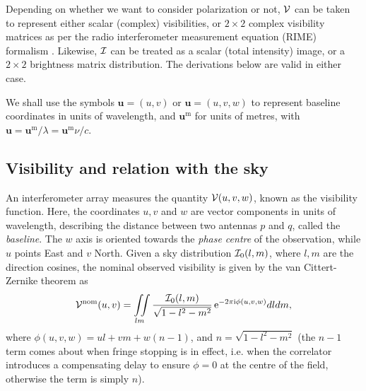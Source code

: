 \documentclass[useAMS,usenatbib]{mn2e}
\newcommand{\ee}{\mathrm{e}}
\newcommand{\ii}{\mathrm{i}}
\begin{document}
Depending on whether we want to consider polarization or not, $\mathcal{V}$ can be taken to represent either 
scalar (complex) visibilities, or $2\times2$ complex visibility matrices  as per the radio interferometer 
measurement equation (RIME) formalism \citep{smirnov2011revisiting}. Likewise, $\mathcal{I}$ can be treated as a scalar 
(total intensity) image, or a $2\times2$ brightness matrix distribution. The derivations below 
are valid in either case.

We shall use the symbols $\mathbf{u}=(u,v)$ or $\mathbf{u}=(u,v,w)$ to represent baseline coordinates in units of wavelength, and 
$\mathbf{u}^\mathrm{m}$ for units of metres, with $\mathbf{u} = \mathbf{u}^\mathrm{m}/\lambda = \mathbf{u}^\mathrm{m}\nu/c$.

\subsection{Visibility and relation with the sky}
\label{sec:visSky}
An interferometer array measures the quantity $\mathcal{V}(u,v,w)$, known as the visibility function.
Here, the coordinates $u,v$ and $w$ are vector components in units of wavelength, describing the distance between 
two antennas $p$ and $q$, called the \emph{baseline}. The $w$ axis is oriented towards the \emph{phase centre} of the observation,
while $u$ points East and $v$ North. Given a sky distribution $\mathcal{I}_0(l,m)$, where $l,m$ are the direction cosines,
the nominal observed visibility is given by the van 
Cittert-Zernike theorem \citep{thompson1999fundamentals,thompson2001fundamentals} as
\begin{equation}
\VV^\mathrm{nom}(u,v) =\iint\limits_{lm} \frac{\II_0(l,m)}{\sqrt{1-l^2 - m^2}}\,\ee^{-2\pi\ii\phi (u,v,w)}dldm, \label{eq:visSky:nom}
\end{equation} 
where $\phi(u,v,w)=ul+vm+w(n-1)$, and $n=\sqrt{1-l^2 - m^2}$ (the $n-1$ term comes about when fringe 
stopping is in effect, i.e. when 
the correlator introduces a compensating delay to ensure $\phi=0$ at the centre of the field, otherwise the term is simply $n$). 
\end{document}
